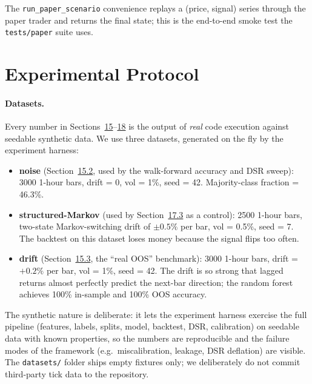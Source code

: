\documentclass[11pt,a4paper]{article}
\let\oldsection\section
\renewcommand{\section}{\clearpage\oldsection}
\begin{document}
The \texttt{run\_paper\_scenario} convenience replays a
(price, signal) series through the paper trader and returns
the final state; this is the end-to-end smoke test the
\texttt{tests/paper} suite uses.

\section{Experimental Protocol}\label{sec:exp}

\paragraph{Datasets.}
Every number in Sections~\hyperref[sec:results]{15}--\hyperref[sec:qual]{18}
is the output of \emph{real} code execution against
seedable synthetic data. We use three datasets, generated
on the fly by the experiment harness:

\begin{itemize}[leftmargin=1.2em,itemsep=0.05em,topsep=0.1em]
    \item \textbf{noise} (Section~\hyperref[sec:results]{15.2}, used by
    the walk-forward accuracy and DSR sweep): 3000 1-hour
    bars, drift = 0, vol = 1\%, seed = 42. Majority-class
    fraction = 46.3\%.
    \item \textbf{structured-Markov} (used by
    Section~\hyperref[sec:leak]{17.3} as a control): 2500
    1-hour bars, two-state Markov-switching drift of
    $\pm 0.5\%$ per bar, vol = 0.5\%, seed = 7. The
    backtest on this dataset loses money because the
    signal flips too often.
    \item \textbf{drift} (Section~\hyperref[sec:drift]{15.3}, the
    ``real OOS'' benchmark): 3000 1-hour bars,
    drift = $+0.2\%$ per bar, vol = 1\%, seed = 42. The
    drift is so strong that lagged returns almost
    perfectly predict the next-bar direction; the
    random forest achieves 100\% in-sample and 100\%
    OOS accuracy.
\end{itemize}
The synthetic nature is deliberate: it lets the
experiment harness exercise the full pipeline (features,
labels, splits, model, backtest, DSR, calibration) on
seedable data with known properties, so the numbers are
reproducible and the failure modes of the framework
(e.g.\ miscalibration, leakage, DSR deflation) are
visible. The \texttt{datasets/} folder ships empty
fixtures only; we deliberately do not commit third-party
tick data to the repository.
\end{document}
